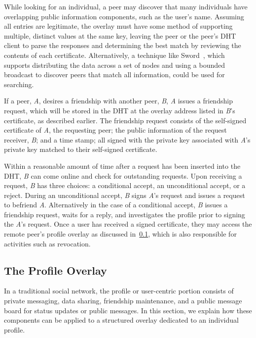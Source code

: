 \documentclass[letterpaper,twocolumn,10pt]{article}
\begin{document}
While looking for an individual, a peer may discover that many individuals have
overlapping public information components, such as the user's name.  Assuming
all entries are legitimate, the overlay must have some method of supporting
multiple, distinct values at the same key, leaving the peer or the peer's DHT
client to parse the responses and determining the best match by reviewing the
contents of each certificate.  Alternatively, a technique like
Sword~\cite{sword}, which supports distributing the data across a set of nodes
and using a bounded broadcast to discover peers that match all information,
could be used for searching.

If a peer, \textit{A}, desires a friendship with another peer, \textit{B},
\textit{A} issues a friendship request, which will be stored in the DHT
at the overlay address listed in \textit{B}'s certificate, as described earlier.
The friendship request consists of the self-signed certificate of
\textit{A}, the requesting peer; the public information of the request receiver,
\textit{B}; and a time stamp; all signed with the private key associated with 
\textit{A}'s private key matched to their self-signed certificate.

Within a reasonable amount of time after a request has been inserted into the
DHT, \textit{B} can come online and check for outstanding requests.  Upon
receiving a request, \textit{B} has three choices: a conditional accept, an
unconditional accept, or a reject.  During an unconditional accept, \textit{B}
signs \textit{A}'s request and issues a request to befriend \textit{A}.
Alternatively in the case of a conditional accept, \textit{B} issues a friendship
request, waits for a reply, and investigates the profile prior to signing the
\textit{A}'s request.  Once a user has received a signed certificate,
they may access the remote peer's profile overlay as discussed
in~\ref{profile_overlay}, which is also responsible for activities such as
revocation.


\subsection{The Profile Overlay}
\label{profile_overlay}
In a traditional social network, the profile or user-centric portion consists
of private messaging, data sharing, friendship maintenance, and a
public message board for status updates or public messages.  In this
section, we explain how these components can be applied to a structured overlay
dedicated to an individual profile.
\end{document}
